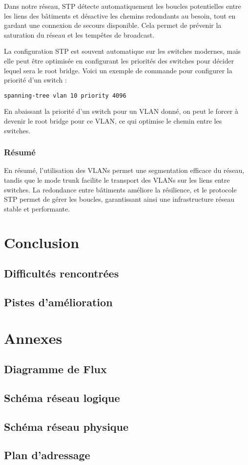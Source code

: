 \documentclass[a4paper,12pt]{report}
\begin{document}
Dans notre réseau, STP détecte automatiquement les boucles potentielles entre les liens des bâtiments et désactive les chemins redondants au besoin, tout en gardant une connexion de secours disponible. Cela permet de prévenir la saturation du réseau et les tempêtes de broadcast.

La configuration STP est souvent automatique sur les switches modernes, mais elle peut être optimisée en configurant les priorités des switches pour décider lequel sera le root bridge. Voici un exemple de commande pour configurer la priorité d'un switch :

\begin{verbatim}
spanning-tree vlan 10 priority 4096
\end{verbatim}

En abaissant la priorité d'un switch pour un VLAN donné, on peut le forcer à devenir le root bridge pour ce VLAN, ce qui optimise le chemin entre les switches.

\subsection{Résumé}
En résumé, l'utilisation des VLANs permet une segmentation efficace du réseau, tandis que le mode trunk facilite le transport des VLANs sur les liens entre switches. La redondance entre bâtiments améliore la résilience, et le protocole STP permet de gérer les boucles, garantissant ainsi une infrastructure réseau stable et performante.

    \chapter{Conclusion}
        \section{Difficultés rencontrées}
        \section{Pistes d'amélioration}

    \chapter*{Annexes}
        \section{Diagramme de Flux}
        \section{Schéma réseau logique}
        \section{Schéma réseau physique}
        \section{Plan d'adressage}
        
\end{document}
